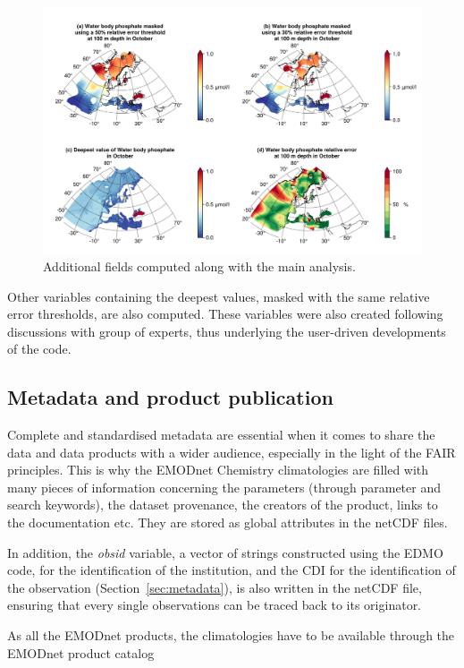 \documentclass[essd, manuscript]{copernicus}
\begin{document}
\begin{figure}[t]
\includegraphics[width=\textwidth]{Water_body_phosphate_depth-100_month-10_additional_fields.png}
\caption{Additional fields computed along with the main analysis.\label{fig:additionalfields}}
\end{figure}

Other variables containing the deepest values, masked with the same relative error thresholds, are also computed. These variables were also created following discussions with group of experts, thus underlying the user-driven developments of the code.

\subsection{Metadata and product publication}

Complete and standardised metadata are essential when it comes to share the data and data products with a wider audience, especially in the light of the FAIR principles. This is why the EMODnet Chemistry climatologies are filled with many pieces of information concerning the parameters (through parameter and search keywords), the dataset provenance, the creators of the product, links to the documentation etc. They are stored as global attributes in the netCDF files.

In addition, the \textit{obsid} variable, a vector of strings constructed using the EDMO code, for the identification of the institution, and the CDI for the identification of the observation (Section~\ref{sec:metadata}), is also written in the netCDF file, ensuring that every single observations can be traced back to its originator.

As all the EMODnet products, the climatologies have to be available through the EMODnet product catalog \citep[][https://emodnet.ec.europa.eu/en]{BEJA2024}
\end{document}

